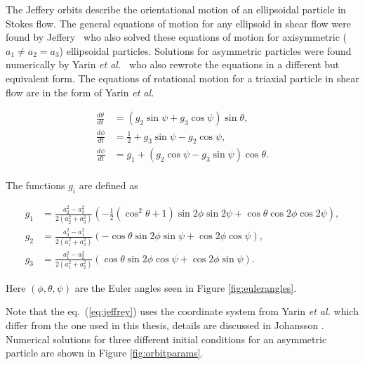 \label{sec:jeffery}
The Jeffery orbits describe the orientational motion of an ellipsoidal particle in Stokes flow. The general equations of motion for any ellipsoid in shear flow were found by Jeffery~\cite{Jeffery} who also solved these equations of motion for axisymmetric ($a_1 \ne a_2 = a_3$) ellipsoidal particles. Solutions for asymmetric particles were found numerically by Yarin \emph{et al.}~\cite{Yarin} who also rewrote the equations in a different but equivalent form. The equations of rotational motion for a triaxial particle in shear flow are in the form of Yarin \emph{et al.}

\begin{subequations}\label{eq:jeffrey}
\begin{align}
\frac{d\theta}{dt} 	&= (g_2 \sin \psi + g_3 \cos \psi ) \sin \theta, \\
\frac{d\phi}{dt} 	&= \tfrac{1}{2} + g_3\sin \psi - g_2 \cos \psi,\\
\frac{d\psi}{dt}	&= g_1 + (g_2\cos \psi - g_3\sin \psi) \cos \theta. \\
\end{align}
\end{subequations}

\noindent The functions  $g_i$ are defined as

\begin{subequations}
\begin{align}
g_1 &= \frac{a_2^2 - a_3^2}{2(a_2^2 + a_3^2)} 
		\left(-\tfrac{1}{2}(\cos^2 \theta + 1 )\sin 2\phi \sin 2\psi + \cos\theta \cos 2\phi \cos 2\psi \right), \\
g_2 &= \frac{a_3^2 - a_1^2}{2(a_1^2 + a_3^2)}
		\left( -\cos\theta \sin 2\phi \sin\psi  +  \cos 2\phi \cos\psi \right), \\
g_3 &= \frac{a_1^2 - a_2^2}{2(a_1^2 + a_2^2)}
		\left( \cos\theta \sin 2\phi \cos\psi + \cos 2\phi \sin\psi \right).
\end{align}
\end{subequations}

\noindent Here $(\phi, \theta, \psi)$ are the Euler angles seen in Figure \ref{fig:eulerangles}. 

Note that the eq.~(\ref{eq:jeffrey}) uses the coordinate system from Yarin \emph{et al.}\cite{Yarin} which differ from the one used in this thesis, details are discussed in Johansson \cite{AntonThesis}. Numerical solutions for three different initial conditions for an asymmetric particle are shown in Figure \ref{fig:orbitparams}.

